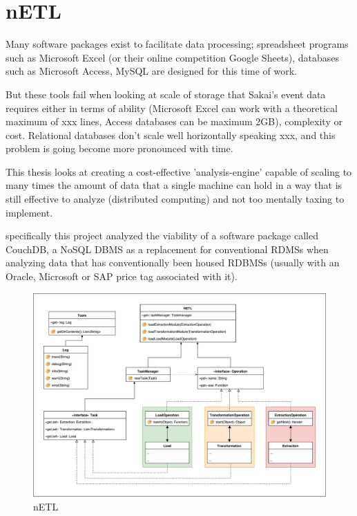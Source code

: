 \section{nETL}
Many software packages exist to facilitate data processing; spreadsheet programs such as Microsoft Excel (or their online competition Google Sheets), databases such as Microsoft Access, MySQL are designed for this time of work.

But these tools fail when looking at scale of storage that Sakai's event data requires either in terms of ability (Microsoft Excel can work with a theoretical maximum of xxx lines, Access databases can be maximum 2GB), complexity or cost. Relational databases don't scale well horizontally speaking xxx, and this problem is going become more pronounced with time.

This thesis looks at creating a cost-effective 'analysis-engine' capable of scaling to many times the amount of data that a single machine can hold in a way that is still effective to analyze (distributed computing) and not too mentally taxing to implement.

specifically this project analyzed the viability of a software package called CouchDB, a NoSQL DBMS as a replacement for conventional RDMSs when analyzing data that has conventionally been housed RDBMSs (usually with an Oracle, Microsoft or SAP price tag associated with it).

\begin{figure}[h]
    \centering
    \includegraphics[scale=0.4]{./resources/figures/netlUML.pdf}
    \caption[nETL]{nETL}
    \label{nETL}
\end{figure}

